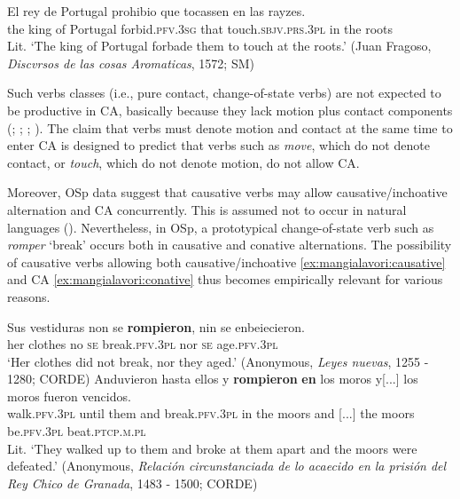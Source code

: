 \documentclass[output=paper,colorlinks,citecolor=brown,
]{langscibook}
\begin{document}
\ea\label{ex:mangialavori:tocar}
    \gll El rey de Portugal prohibio que tocassen en las rayzes.\\
the king of Portugal forbid.\textsc{pfv}.\textsc{3sg} that touch.\textsc{sbjv}.\textsc{prs}.\textsc{3pl} in the roots\\
    \glt Lit. ‘The king of Portugal forbade them to touch at the roots.’ (Juan Fragoso, \textit{Discvrsos de las cosas Aromaticas}, 1572; SM)
\z

Such verbs classes (i.e., pure contact, change-of-state verbs) are not expected to be productive in CA, basically because they lack motion plus contact components (\citealt{Guersseletal1985}; \citealt{Laughren1988}; \citealt{Levin1993}; \citealt{Goldberg1995}). The claim that verbs must denote motion and contact at the same time to enter CA is designed to predict that verbs such as \textit{move}, which do not denote contact, or \textit{touch}, which do not denote motion, do not allow CA.

\ea
  \z 
\z 

Moreover, OSp data suggest that causative verbs may allow causative/inchoative alternation and CA concurrently. This is assumed not to occur in natural languages (\citealt{Levin1993, Levin2017}). Nevertheless, in OSp, a prototypical change-of-state verb such as \textit{romper} ‘break’ occurs both in causative and conative alternations. The possibility of causative verbs allowing both causative/inchoative  \ref{ex:mangialavori:causative} and CA  \ref{ex:mangialavori:conative} thus becomes empirically relevant for various reasons.

\ea
  \ea\label{ex:mangialavori:causative}
    \gll Sus vestiduras non se \textbf{rompieron}, nin se enbeiecieron.\\
her clothes no \textsc{se} break.\textsc{pfv}.\textsc{3pl} nor \textsc{se} age.\textsc{pfv}.\textsc{3pl}\\
    \glt ‘Her clothes did not break, nor they aged.’ (Anonymous, \textit{Leyes nuevas}, 1255 - 1280; CORDE)
  \ex\label{ex:mangialavori:conative}
    \gll Anduvieron hasta ellos y \textbf{rompieron} \textbf{en} los moros y[...] los moros fueron vencidos.\\
walk.\textsc{pfv}.\textsc{3pl} until them and break.\textsc{pfv}.\textsc{3pl} in the moors and [...] the moors be.\textsc{pfv}.\textsc{3pl} beat.\textsc{ptcp}.\textsc{m}.\textsc{pl}\\
    \glt Lit. ‘They walked up to them and broke at them apart and the moors were defeated.’ (Anonymous, \textit{Relación circunstanciada de lo acaecido en la prisión del Rey Chico de Granada}, 1483 - 1500; CORDE)
  \z 
\z 
\end{document}
